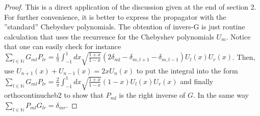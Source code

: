 \documentclass[10pt]{book}
\let\int\int
\theoremstyle{break}
\begin{document}
\begin{proof}
This is a direct application of the discussion given at the end of section 2. For further convenience, it is better to express the propagator with the ''standard'' Chebyshev polynomials. The obtention of {invers-G} is just routine calculation that uses the recurrence for the Chebyshev polynomials $U_m$. Notice that one can easily check for instance $\sum_{l\in\mathbb{N}}G_{ml}P_{lr}={\frac{1}{\pi}}\int_{-1}^1dx{\sqrt{\frac{1+x}{1-x}}}(2\delta_{ml}-\delta_{m,l+1}-\delta_{m,l-1})U_l(x)U_r(x)$. Then, use $U_{n+1}(x)+U_{n-1}(x)=2xU_n(x)$ to put the integral into the form $\sum_{l\in\mathbb{N}}G_{ml}P_{lr}=\frac{2}{\pi}\int_{-1}^1dx{\sqrt{\frac{1+x}{1-x}}}(1-x)U_l(x)U_r(x)$ and finally {orthocontinucheb2} to show that $P_{ml}$ is the right inverse of $G$. In the same way $\sum_{l\in\mathbb{N}}P_{ml}G_{lr}=\delta_{mr}$.
\end{proof}
\end{document}
